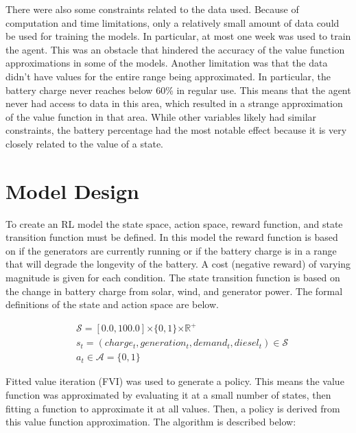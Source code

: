 \documentclass{article}
\begin{document}
There were also some constraints related to the data used. Because of computation and time limitations, only a relatively small amount of data could  be used for training the models. In particular, at most one week was used to train the agent. This was an obstacle that hindered the accuracy of the value function approximations in some of the models. Another limitation was that the data didn't have values for the entire range being approximated. In particular, the battery charge never reaches below 60\% in regular use. This means that the agent never had access to data in this area, which resulted in a strange approximation of the value function in that area. While other variables likely had similar constraints, the battery percentage had the most notable effect because it is very closely related to the value of a state.


\section{Model Design}

To create an RL model the state space, action space, reward function, and state transition function must be defined. In this model the reward function is based on if the generators are currently running or if the battery charge is in a range that will degrade the longevity of the battery. A cost (negative reward) of varying magnitude is given for each condition. The state transition function is based on the change in battery charge from solar, wind, and generator power. The formal definitions of the state and action space are below.

\begin{align}
    & \mathcal{S}=[0.0, 100.0] \mathcal{\times} \{0, 1\} \mathcal{\times} \mathbb{R^+} \\ \nonumber
    & s_t = (charge_t, generation_t, demand_t, diesel_t) \in \mathcal{S} \\ \nonumber
    & a_t \in \mathcal{A}=\{0,1\} \nonumber
\end{align}


Fitted value iteration (FVI) was used to generate a policy. This means the value function was approximated by evaluating it at a small number of states, then fitting a function to approximate it at all values. Then, a policy is derived from this value function approximation. The algorithm is described below:
\end{document}
